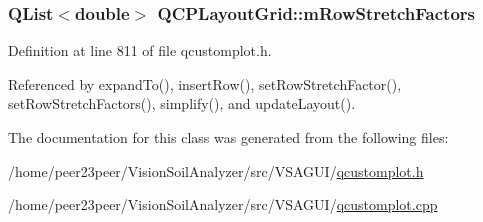 \subsubsection[{m\+Row\+Stretch\+Factors}]{\setlength{\rightskip}{0pt plus 5cm}Q\+List$<$double$>$ Q\+C\+P\+Layout\+Grid\+::m\+Row\+Stretch\+Factors\hspace{0.3cm}{\ttfamily [protected]}}\label{class_q_c_p_layout_grid_a36c85a7eaf342680fb9b8a4977486f16}


Definition at line 811 of file qcustomplot.\+h.



Referenced by expand\+To(), insert\+Row(), set\+Row\+Stretch\+Factor(), set\+Row\+Stretch\+Factors(), simplify(), and update\+Layout().



The documentation for this class was generated from the following files\+:\begin{DoxyCompactItemize}
\item 
/home/peer23peer/\+Vision\+Soil\+Analyzer/src/\+V\+S\+A\+G\+U\+I/\hyperlink{qcustomplot_8h}{qcustomplot.\+h}\item 
/home/peer23peer/\+Vision\+Soil\+Analyzer/src/\+V\+S\+A\+G\+U\+I/\hyperlink{qcustomplot_8cpp}{qcustomplot.\+cpp}\end{DoxyCompactItemize}
